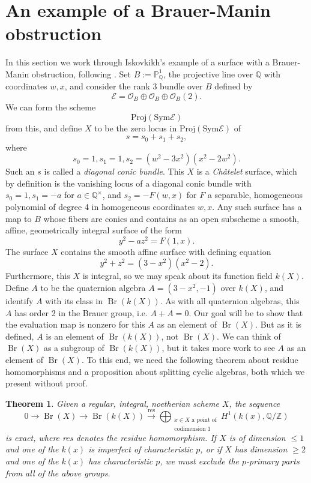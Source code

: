 \documentclass[12pt,twoside]{reedthesis}
\theoremstyle{plain}
\newtheorem{theorem}{Theorem}[chapter]
\theoremstyle{definition}
\theoremstyle{remark}
\newcommand{\ZZ}{\mathbb{Z}}
\newcommand{\QQ}{\mathbb{Q}}
\newcommand{\Proj}{\mathbb{P}}
\newcommand{\calO}{\mathcal{O}}
\newcommand{\Br}{\operatorname{Br}}
\begin{document}
\section{An example of a Brauer-Manin obstruction}
In this section we work through Iskovkikh's example of a surface with a Brauer-Manin obstruction, following \cite[Section 8.2]{qPoints}. Set $B:=\Proj^1_\QQ$, the projective line over $\QQ$ with coordinates $w,x$, and consider the rank 3 bundle over $B$ defined by
\[
\mathscr{E}=\calO_B\oplus\calO_B\oplus\calO_B(2).
\]
We can form the scheme 
\[
\text{Proj}(\text{Sym}\mathscr{E})
\]
from this, and define $X$ to be the zero locus in $\text{Proj}(\text{Sym}\mathscr{E})$ of
\[
s=s_0+s_1+s_2,
\]
where 
\[
s_0=1, s_1=1, s_2=(w^2-3x^2)(x^2-2w^2).
\]
Such an $s$ is called a \emph{diagonal conic bundle}. This $X$ is a \emph{Ch\^atelet} surface, which by definition is the vanishing locus of a diagonal conic bundle with $s_0=1, s_1=-a$ for $a\in\QQ^\times$, and $s_2=-F(w,x)$ for $F$ a separable, homogeneous polynomial of degree 4 in homogeneous coordinates $w,x$. Any such surface has a map to $B$ whose fibers are conics and contains as an open subscheme a smooth, affine, geometrically integral surface of the form
\[
y^2-az^2=F(1,x).
\] 
The surface $X$ contains the smooth affine surface with defining equation
\[
y^2+z^2=(3-x^2)(x^2-2).
\]
Furthermore, this $X$ is integral, so we may speak about its function field $k(X)$. Define $A$ to be the quaternion algebra $A=(3-x^2,-1)$ over $k(X)$, and identify $A$ with its class in $\Br(k(X))$. As with all quaternion algebras, this $A$ has order 2 in the Brauer group, i.e. $A+A=0$. Our goal will be to show that the evaluation map is nonzero for this $A$ as an element of $\Br(X)$. But as it is defined, $A$ is an element of $\Br(k(X))$, not $\Br(X)$. We can think of $\Br(X)$ as a subgroup of $\Br(k(X))$, but it takes more work to see $A$ as an element of $\Br(X)$. To this end, we need the following theorem about residue homomorphisms and a proposition about splitting cyclic algebras, both which we present without proof.
\begin{theorem}
Given a regular, integral, noetherian scheme $X$, the sequence
\[
0\to\Br(X)\to\Br(k(X))\xrightarrow{\text{res}}\bigoplus_{\substack{x\in X\text{ a point of}\\\text{codimension 1}}}H^1(k(x),\QQ/\ZZ)
\]
is exact, where res denotes the residue homomorphism. If $X$ is of dimension $\leq1$ and one of the $k(x)$ is imperfect of characteristic $p$, or if $X$ has dimension $\geq2$ and one of the $k(x)$ has characteristic $p$, we must exclude the $p$-primary parts from all of the above groups.
\end{theorem}
\end{document}
